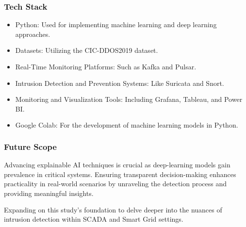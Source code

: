 \documentclass{beamer}
\begin{document}
\begin{frame}
\frametitle{Tech Stack}
\begin{block} {
\begin{itemize}
    \item Python: Used for implementing machine learning and deep learning approaches.
    \item Datasets: Utilizing the CIC-DDOS2019 dataset.
    \item Real-Time Monitoring Platforms: Such as Kafka and Pulsar.
    \item Intrusion Detection and Prevention Systems: Like Suricata and Snort.
    \item Monitoring and Visualization Tools: Including Grafana, Tableau, and Power BI.
    \item Google Colab: For the development of machine learning models in Python.
\end{itemize}}
\end{block}

\end{frame}

\begin{frame}
\frametitle{Future Scope}
\begin{block}
    {Advancing explainable AI techniques is crucial as deep-learning models gain prevalence in critical systems. Ensuring transparent decision-making enhances practicality in real-world scenarios by unraveling the detection process and providing meaningful insights.}
\end{block}
\begin{block}
    {Expanding on this study's foundation to delve deeper into the nuances of intrusion detection within SCADA and Smart Grid settings. }
\end{block}
\end{frame}





\end{document}
